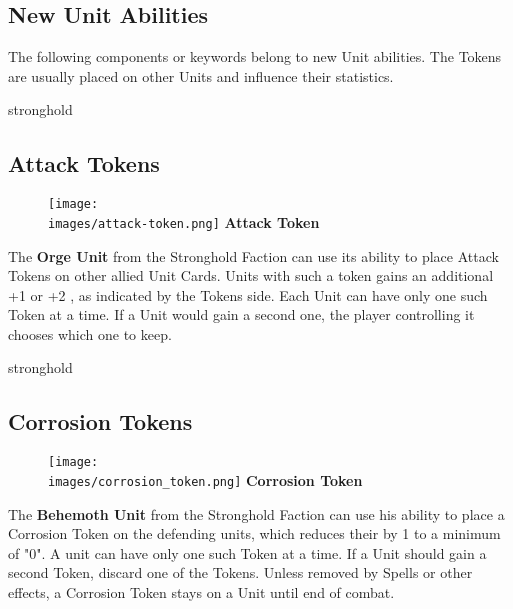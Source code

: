 \begin{multicols*}{2}

\subsection*{New Unit Abilities}
The following components or keywords belong to new Unit abilities. The Tokens are usually placed on other Units and influence their statistics.


\begin{expansion}{stronghold}
	\subsection*{Attack Tokens}
	\setlength\intextsep{0pt}
    \setlength\columnsep{1em}
    \begin{wrapfigure}{r}{0.2\linewidth}
        \texttt{[image: \\images/attack-token.png]}
        \centering\textbf{\scriptsize\color{darkcandyapplered}Attack \mbox{Token}\\}
    \end{wrapfigure}
    The \textbf{Orge Unit} from the Stronghold Faction can use its  ability to place Attack Tokens on other allied Unit Cards.
    Units with such a token gains an additional +1  or +2 , as indicated by the Tokens side.
    Each Unit can have only one such Token at a time.
    If a Unit would gain a second one, the player controlling it chooses which one to keep.
\end{expansion}
\vspace*{1em}

\begin{expansion}{stronghold}
	\subsection*{Corrosion Tokens}
	\setlength\intextsep{0pt}
    \setlength\columnsep{1em}
    \begin{wrapfigure}{r}{0.2\linewidth}
        \texttt{[image: \\images/corrosion\_token.png]}
        \centering\textbf{\scriptsize\color{darkcandyapplered}Corrosion \mbox{Token}\\}
    \end{wrapfigure}The \textbf{Behemoth Unit} from the Stronghold Faction can use his  ability to place a Corrosion Token on the defending units, which reduces their  by 1 to a minimum of "0". A unit can have only one such Token at a time.
	If a Unit should gain a second Token, discard one of the Tokens. Unless removed by Spells or other effects, a Corrosion Token stays on a Unit until end of combat.
\end{expansion}


\end{multicols*}
